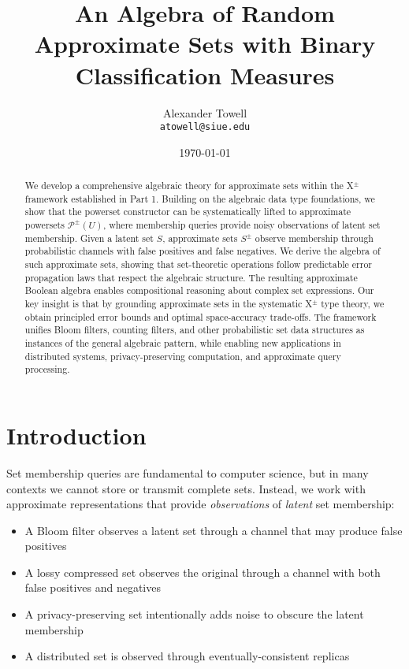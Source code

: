 \documentclass[11pt,final,hidelinks]{article}
\title{An Algebra of Random Approximate Sets with Binary Classification Measures}
\author{
    Alexander Towell\\
    \texttt{atowell@siue.edu}
}
\date{\today}
\begin{document}
\maketitle
\NotationSection

\begin{abstract}
We develop a comprehensive algebraic theory for approximate sets within the X$^{\pm}$ framework established in Part 1. Building on the algebraic data type foundations, we show that the powerset constructor can be systematically lifted to approximate powersets $\mathcal{P}^{\pm}(U)$, where membership queries provide noisy observations of latent set membership. Given a latent set $S$, approximate sets $S^{\pm}$ observe membership through probabilistic channels with false positives and false negatives. We derive the algebra of such approximate sets, showing that set-theoretic operations follow predictable error propagation laws that respect the algebraic structure. The resulting approximate Boolean algebra enables compositional reasoning about complex set expressions. Our key insight is that by grounding approximate sets in the systematic X$^{\pm}$ type theory, we obtain principled error bounds and optimal space-accuracy trade-offs. The framework unifies Bloom filters, counting filters, and other probabilistic set data structures as instances of the general algebraic pattern, while enabling new applications in distributed systems, privacy-preserving computation, and approximate query processing.
\end{abstract}

\section{Introduction}

Set membership queries are fundamental to computer science, but in many contexts we cannot store or transmit complete sets. Instead, we work with approximate representations that provide \emph{observations} of \emph{latent} set membership:

\begin{itemize}
    \item A Bloom filter observes a latent set through a channel that may produce false positives
    \item A lossy compressed set observes the original through a channel with both false positives and negatives  
    \item A privacy-preserving set intentionally adds noise to obscure the latent membership
    \item A distributed set is observed through eventually-consistent replicas
\end{itemize}
\end{document}
